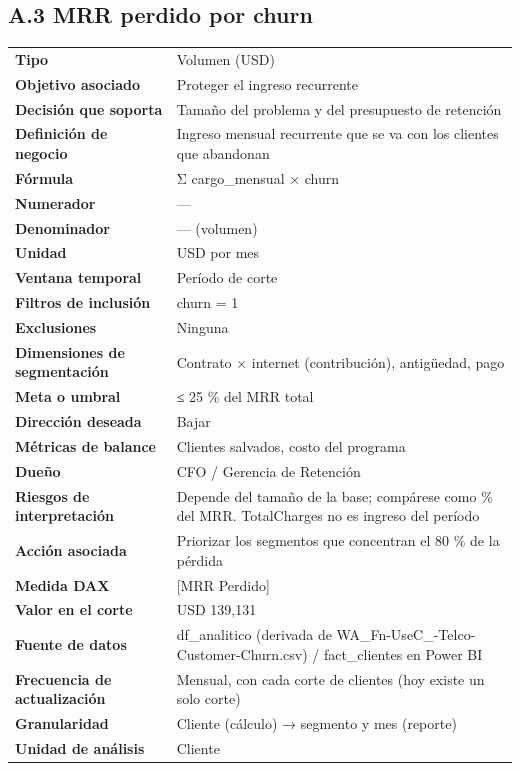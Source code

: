 \subsection*{A.3 MRR perdido por churn}
\begin{footnotesize}
\begin{longtable}{@{}p{}p{}@{}}
\toprule
\textbf{Tipo} & Volumen (USD) \\
\textbf{Objetivo asociado} & Proteger el ingreso recurrente \\
\textbf{Decisión que soporta} & Tamaño del problema y del presupuesto de retención \\
\textbf{Definición de negocio} & Ingreso mensual recurrente que se va con los clientes que abandonan \\
\textbf{Fórmula} & Σ cargo\_mensual × churn \\
\textbf{Numerador} & — \\
\textbf{Denominador} & — (volumen) \\
\textbf{Unidad} & USD por mes \\
\textbf{Ventana temporal} & Período de corte \\
\textbf{Filtros de inclusión} & churn = 1 \\
\textbf{Exclusiones} & Ninguna \\
\textbf{Dimensiones de segmentación} & Contrato × internet (contribución), antigüedad, pago \\
\textbf{Meta o umbral} & ≤ 25 \% del MRR total \\
\textbf{Dirección deseada} & Bajar \\
\textbf{Métricas de balance} & Clientes salvados, costo del programa \\
\textbf{Dueño} & CFO / Gerencia de Retención \\
\textbf{Riesgos de interpretación} & Depende del tamaño de la base; compárese como \% del MRR. TotalCharges no es ingreso del período \\
\textbf{Acción asociada} & Priorizar los segmentos que concentran el 80 \% de la pérdida \\
\textbf{Medida DAX} & [MRR Perdido] \\
\textbf{Valor en el corte} & USD 139,131 \\
\textbf{Fuente de datos} & df\_analitico (derivada de WA\_Fn-UseC\_-Telco-Customer-Churn.csv) / fact\_clientes en Power BI \\
\textbf{Frecuencia de actualización} & Mensual, con cada corte de clientes (hoy existe un solo corte) \\
\textbf{Granularidad} & Cliente (cálculo) → segmento y mes (reporte) \\
\textbf{Unidad de análisis} & Cliente \\
\bottomrule
\end{longtable}
\end{footnotesize}

